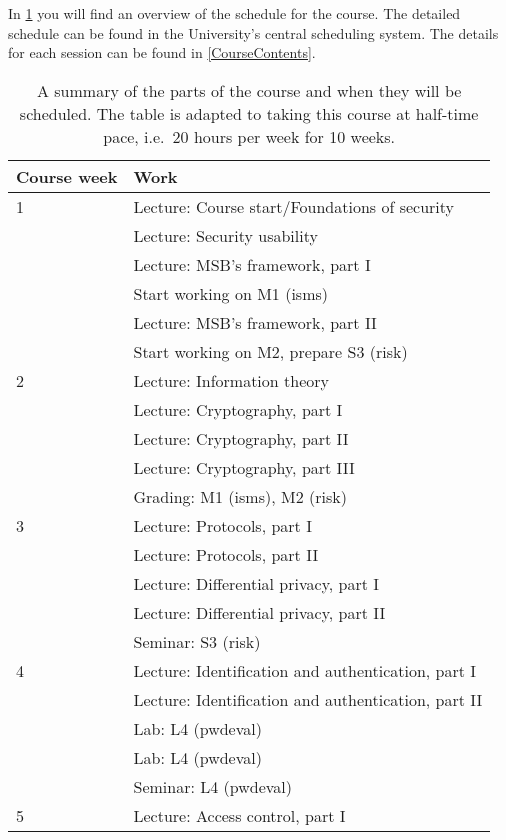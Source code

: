 In \cref{Schedule} you will find an overview of the schedule for the course.
The detailed schedule can be found in the University's central scheduling 
system.
The details for each session can be found in \cref{CourseContents}.

\begin{table}
	\centering
  \caption{%
    A summary of the parts of the course and when they will be scheduled.
    The table is adapted to taking this course at half-time pace, i.e.\ 20 
    hours per week for 10 weeks.
  }\label{Schedule}
  \begin{tabular}{lp{9cm}}
    \toprule
    \textbf{Course week}	& \textbf{Work} \\
    \midrule
    1
      & Lecture: Course start/Foundations of security\\
      & Lecture: Security usability\\
      & Lecture: MSB's framework, part I\\
      & Start working on M1 (isms)\\
      & Lecture: MSB's framework, part II\\
      & Start working on M2, prepare S3 (risk)\\
    \midrule
    2
      & Lecture: Information theory\\
      & Lecture: Cryptography, part I\\
      & Lecture: Cryptography, part II\\
      & Lecture: Cryptography, part III\\
      & Grading: M1 (isms), M2 (risk)\\
    \midrule
    3
      & Lecture: Protocols, part I\\
      & Lecture: Protocols, part II\\
      & Lecture: Differential privacy, part I\\
      & Lecture: Differential privacy, part II\\
      & Seminar: S3 (risk)\\
    \midrule
    4
      & Lecture: Identification and authentication, part I\\
      & Lecture: Identification and authentication, part II\\
      & Lab: L4 (pwdeval)\\
      & Lab: L4 (pwdeval)\\
      & Seminar: L4 (pwdeval)\\
    \midrule
    5
      & Lecture: Access control, part I\\

\end{tabular}
\end{table}
